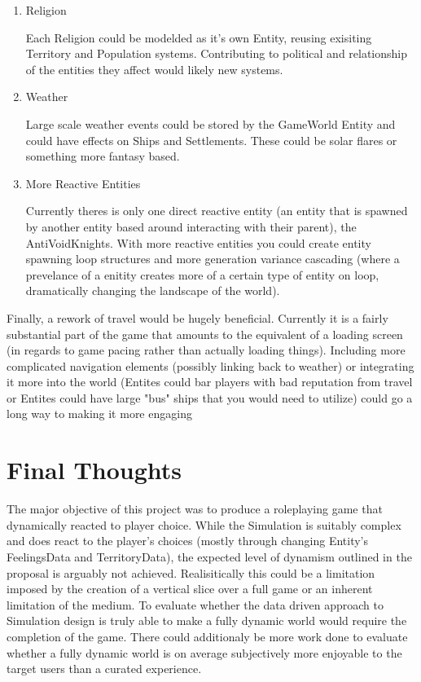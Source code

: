 \documentclass{report}
\begin{document}
\begin{enumerate}

	\item	Religion

Each Religion could be modelded as it's own Entity, reusing exisiting Territory and Population systems. Contributing to political and relationship of the entities they affect would likely new systems.
 
	\item Weather

Large scale weather events could be stored by the GameWorld Entity and could have effects on Ships and Settlements. These could be solar flares or something more fantasy based.

	\item More Reactive Entities

Currently theres is only one direct reactive entity (an entity that is spawned by another entity based around interacting with their parent), the AntiVoidKnights. With more reactive entities you could create entity spawning loop structures and more generation variance cascading (where a prevelance of a enitity creates more of a certain type of entity on loop, dramatically changing the landscape of the world).

\end{enumerate}

Finally, a rework of travel would be hugely beneficial. Currently it is a fairly substantial part of the game that amounts to the equivalent of a loading screen (in regards to game pacing rather than actually loading things). Including more complicated navigation elements (possibly linking back to weather) or integrating it more into the world (Entites could bar players with bad reputation from travel or Entites could have large "bus" ships that you would need to utilize) could go a long way to making it more engaging


\section{Final Thoughts}

The major objective of this project was to produce a roleplaying game that dynamically reacted to player choice. While the Simulation is suitably complex and does react to the player's choices (mostly through changing Entity's FeelingsData and TerritoryData), the expected level of dynamism outlined in the proposal is arguably not achieved. Realisitically this could be a limitation imposed by the creation of a vertical slice over a full game or an inherent limitation of the medium. To evaluate whether the data driven approach to Simulation design is truly able to make a fully dynamic world would require the completion of the game. There could additionaly be more work done to evaluate whether a fully dynamic world is on average subjectively more enjoyable to the target users than a curated experience. 
\end{document}

